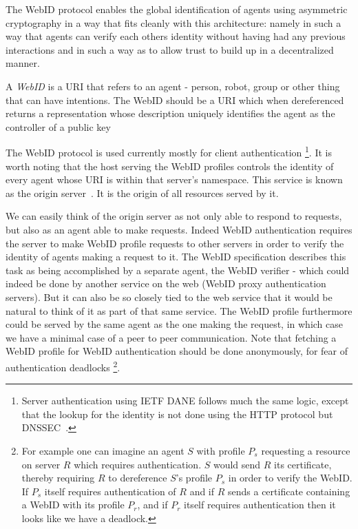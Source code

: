 \documentclass[a4paper]{llncs}
\begin{document}
The WebID protocol enables the global identification of agents using asymmetric cryptography in a way that fits cleanly with this architecture:
namely in such a way that agents can verify each others identity without having had any previous interactions and in such a way as to allow trust to build up in a decentralized manner.

A \textit{WebID} is a URI that refers to an agent - person, robot, group or other thing that can have intentions.
The WebID should be a URI which when dereferenced returns a representation whose description uniquely identifies the agent as the controller of a public key~\cite{sporny-m-2011--a,story-h-2009--a}

The WebID protocol is used currently mostly for client authentication%
\footnote{Server authentication using IETF DANE follows much the same logic, except that the lookup for the identity is not done using the HTTP protocol but DNSSEC~\cite{hoffman-p-2012--a}.}.
It is worth noting that the host serving the WebID profiles controls the identity of every agent whose URI is within that server's namespace.
This service is known as the origin server~\cite{barth-a-2011--a}.
It is the origin of all resources served by it. 

We can easily think of the origin server as not only able to respond to requests, but also as an agent able to make requests.
Indeed WebID authentication requires the server to make WebID profile requests to other servers in order to verify the identity of agents making a request to it.
The WebID specification describes this task as being accomplished by a separate agent, the WebID verifier - which could indeed be done by another service on the web (WebID proxy authentication servers).
But it can also be so closely tied to the web service that it would be natural to think of it as part of that same service.
The WebID profile furthermore could be served by the same agent as the one making the request, in which case we have a minimal case of a peer to peer communication.
Note that fetching a WebID profile for WebID authentication should be done anonymously, for fear of authentication deadlocks%
\footnote{For example one can imagine an agent $S$ with profile $P_s$ requesting a resource on server $R$ which requires authentication.
$S$ would send $R$ its certificate, thereby requiring $R$ to dereference $S$'s profile $P_s$ in order to verify the WebID.
If $P_s$ itself requires authentication of $R$ and if $R$ sends a certificate containing a WebID with its profile $P_r$, and if $P_r$ itself requires authentication then it looks like we have a deadlock.}.
\end{document}
